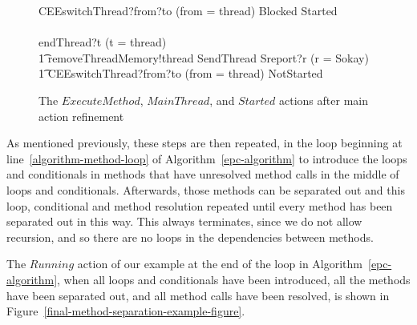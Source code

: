 \begin{figure}[tp!]
\begin{circusaction}
    CEEswitchThread?from?to \prefixcolon (from = thread) \then Blocked \circseq Started \\
    {} \extchoice {} \\
    endThread?t \prefixcolon (t = thread) \then \Skip
    \circblockend \circseq \\
    \t1 removeThreadMemory!thread \then SendThread \then Sreport?r \prefixcolon (r = Sokay) \\
    \t1 {} \then CEEswitchThread?from?to \prefixcolon (from = thread) \then NotStarted
  \end{circusaction}
  \caption{The $ExecuteMethod$, $MainThread$, and $Started$ actions
    after main action refinement}
  \label{refine-main-actions-example-figure}
\end{figure}

As mentioned previously, these steps are then repeated, in the loop
beginning at line~\ref{algorithm-method-loop} of
Algorithm~\ref{epc-algorithm} to introduce the loops and conditionals
in methods that have unresolved method calls in the middle of loops
and conditionals.
Afterwards, those methods can be separated out and this loop,
conditional and method resolution repeated until every method has been
separated out in this way.
This always terminates, since we do not allow recursion, and so there
are no loops in the dependencies between methods.

The $Running$ action of our example at the end of the loop in
Algorithm~\ref{epc-algorithm}, when all loops and conditionals have
been introduced, all the methods have been separated out, and all
method calls have been resolved, is shown in
Figure~\ref{final-method-separation-example-figure}.
%


